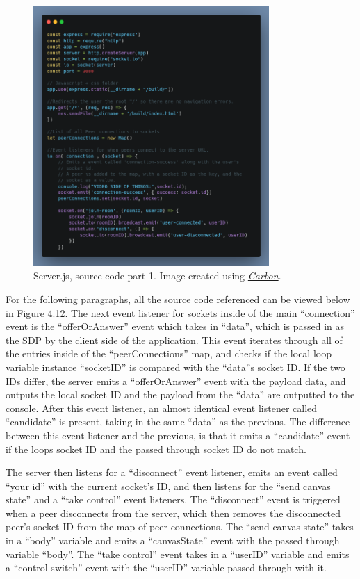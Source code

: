 \begin{figure}[H]
    \centering
    \includegraphics[width=0.8\textwidth]{img/SystemDesign/serverJs_1.png}
    \caption{Server.js, source code part 1. Image created using \href{https://carbon.now.sh/}{\textit{Carbon}}.}
\end{figure}
For the following paragraphs, all the source code referenced can be viewed below in Figure 4.12. The next event listener for sockets inside of the main “connection” event is the “offerOrAnswer” event which takes in “data”, which is passed in as the SDP by the client side of the application. This event iterates through all of the entries inside of the “peerConnections” map, and checks if the local loop variable instance “socketID” is compared with the “data”s socket ID. If the two IDs differ, the server emits a “offerOrAnswer” event with the payload data, and outputs the local socket ID and the payload from the “data” are outputted to the console.
After this event listener, an almost identical event listener called “candidate” is present, taking in the same “data” as the previous. The difference between this event listener and the previous, is that it emits a “candidate” event if the loops socket ID and the passed through socket ID do not match.

The server then listens for a “disconnect” event listener, emits an event called “your id” with the current socket’s ID, and then listens for the “send canvas state” and a “take control” event listeners. The “disconnect” event is triggered when a peer disconnects from the server, which then removes the disconnected peer’s socket ID from the map of peer connections. The “send canvas state” takes in a “body” variable and emits a “canvasState” event with the passed through variable “body”. The “take control” event takes in a “userID” variable and emits a “control switch” event with the “userID” variable passed through with it. 

